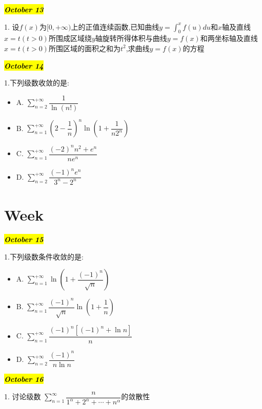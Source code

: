 \hl{\textbf{\textit{October 13}}}

1. 设$f(x)$为$[0,+\infty)$上的正值连续函数,已知曲线$y=\int_{0}^{x}f(u)du$和$x$轴及直线$x=t(t>0)$所围成区域绕$y$轴旋转所得体积与曲线$y=f(x)$和两坐标轴及直线$x=t(t>0)$所围区域的面积之和为$t^2$,求曲线$y=f(x)$的方程
\begin{solution}
	
\end{solution}

\hl{\textbf{\textit{October 14}}}

1.下列级数收敛的是:
\begin{itemize}
	\item A. $\sum\limits_{n=2}^{+\infty}\dfrac{1}{\ln(n!)}$
	\item B. $\sum\limits_{n=1}^{+\infty}(2-\dfrac{1}{n})^{n}\ln(1+\dfrac{1}{n2^{n}})$
	\item C. $\sum\limits_{n=1}^{+\infty}\dfrac{(-2)^{n}n^2+e^{n}}{ne^{n}}$
	\item D. $\sum\limits_{n=2}^{+\infty}\dfrac{(-1)^{n}e^{n}}{3^{n}-2^{n}}$
\end{itemize}
\begin{solution}
	
\end{solution}

\section{Week }

\hl{\textbf{\textit{October 15}}}

1.下列级数条件收敛的是:
\begin{itemize}
	\item A. $\sum\limits_{n=1}^{+\infty}\ln\left( 1+\dfrac{(-1)^n}{\sqrt{n}}\right) $
	\item B. $\sum\limits_{n=1}^{+\infty}\dfrac{(-1)^n}{\sqrt{n}}\ln(1+\dfrac{1}{n})$
	\item C. $\sum\limits_{n=1}^{+\infty}\dfrac{(-1)^{n}\left[(-1)^{n}+\ln n \right] }{n}$
	\item D. $\sum\limits_{n=2}^{+\infty}\dfrac{(-1)^{n}}{n\ln n}$
\end{itemize}
\begin{solution}
	
\end{solution}

\hl{\textbf{\textit{October 16}}}

1. 讨论级数 $\sum\limits_{n=1}^{\infty}\dfrac{n}{1^{\alpha}+2^{\alpha}+\cdots+n^{\alpha}}$的敛散性
\begin{solution}
	
\end{solution}

